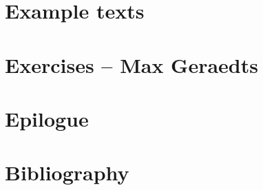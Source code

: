 \documentclass[twoside, openany, 12pt, a5paper]{book}
\begin{document}
\chapter{Example texts}

\chapter{Exercises -- {\small Max Geraedts}} 
\backmatter

\chapter{Epilogue}

{\chapter{Bibliography}}



\end{document}
